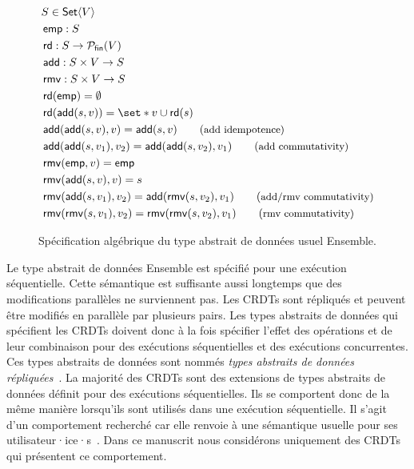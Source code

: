 \begin{figure}[tb]
    \centering
    \begin{align*}
    &S \in \trm{Set}\tuple*{V}\\
    &\trm{emp}: S\\
    &\trm{rd}: S \to \powerfset{V}\\
    &\trm{add}: S \times V \to S\\
    &\trm{rmv}: S \times V \to S\\
    &\trm{rd}(\trm{emp}) = \emptyset \\
    &\trm{rd}(\trm{add}(s, v)) = \set*{v} \cup \trm{rd}(s) \\
    &\trm{add}(\trm{add}(s, v), v) = \trm{add}(s, v) \tag{\small add idempotence}\\
    &\trm{add}(\trm{add}(s, v_1), v_2) = \trm{add}(\trm{add}(s, v_2), v_1) \tag{\small add commutativity}\\
    &\trm{rmv}(\trm{emp}, v) = \trm{emp}\\
    &\trm{rmv}(\trm{add}(s, v), v) = s\\
    &\trm{rmv}(\trm{add}(s, v_1), v_2) = \trm{add}(\trm{rmv}(s, v_2), v_1) \tag{\small add/rmv commutativity}\\
    &\trm{rmv}(\trm{rmv}(s, v_1), v_2) = \trm{rmv}(\trm{rmv}(s, v_2), v_1) \tag{\small rmv commutativity}\\
    \end{align*}
    \caption{Spécification algébrique du type abstrait de données usuel Ensemble.}\label{fig:set-spec}
\end{figure}

Le type abstrait de données Ensemble est spécifié pour une exécution séquentielle.
Cette sémantique est suffisante aussi longtemps que des modifications parallèles ne surviennent pas.
Les \acp{CRDT} sont répliqués et peuvent être modifiés en parallèle par plusieurs pairs.
Les types abstraits de données qui spécifient les \acp{CRDT} doivent donc à la fois spécifier l'effet des opérations et de leur combinaison pour des exécutions séquentielles et des exécutions concurrentes.
Ces types abstraits de données sont nommés \emph{types abstraits de données répliquées}~\autocite{roh_2011_rga}.
La majorité des \acp{CRDT} sont des extensions de types abstraits de données définit pour des exécutions séquentielles.
Ils se comportent donc de la même manière lorsqu'ils sont utilisés dans une exécution séquentielle.
Il s'agit d'un comportement recherché car elle renvoie à une sémantique usuelle pour ses utilisateur·ice·s~\autocite{preguia2018_crdt}.
Dans ce manuscrit nous considérons uniquement des \acp{CRDT} qui présentent ce comportement.

